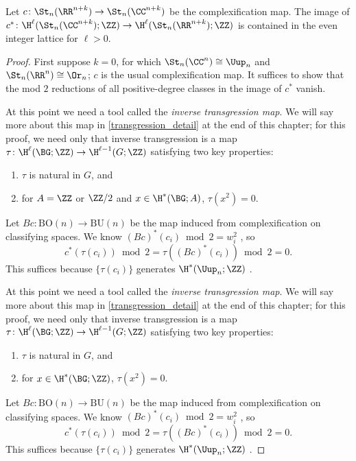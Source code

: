 \begin{lem}[{\cite[Lemma 5.12]{cs}}]
	\label{double_cpxif}
	Let $c\colon\St_n(\RR^{n+k})\to\St_n(\CC^{n+k})$ be the complexification map. The image of $c^*\colon
	\H^\ell(\St_n(\CC^{n+k});\ZZ)\to\H^\ell(\St_n(\RR^{n+k});\ZZ)$ is contained in the even integer lattice
	for $\ell > 0$.
\end{lem}
\begin{proof}
First suppose $k = 0$, for which $\St_n(\CC^n)\cong\Uup_n$ and $\St_n(\RR^n)\cong\Or_n$; $c$ is the usual
complexification map. It suffices to show that the mod $2$ reductions of all positive-degree classes in the image
of $c^*$ vanish.

At this point we need a tool called the \textit{inverse transgression map}. We will say more about this map in \cref{transgression_detail} at the end of this chapter; for
this proof, we need only that inverse transgression is a map $\tau\colon\H^\ell(\BG;\ZZ)\to\H^{\ell-1}(G;\ZZ)$
satisfying two key properties:
\begin{enumerate}[(1)]
	\item $\tau$ is natural in $G$, and
	\item for $A = \ZZ$ or $\ZZ/2$ and $x\in \H^*(\BG; A)$, $\tau(x^2) = 0$.
\end{enumerate}
Let $Bc\colon\mathrm{BO}(n)\to\mathrm{BU}(n)$ be the map induced from complexification on classifying spaces. We
know $(Bc)^*(c_i) \bmod 2 = w_i^2$ \cite[Theorem 1.5]{Bro82}, so
\begin{equation}
	c^*(\tau(c_i))\bmod 2 = \tau((Bc)^*(c_i))\bmod 2 = 0.
\end{equation}
This suffices because $\{\tau(c_i)\}$ generates $\H^*(\Uup_n;\ZZ)$ \cite[Théorèmes 8.2 et 8.3]{Bor54}.

	At this point we need a tool called the \textit{inverse transgression map}. We will say more about this map in \cref{transgression_detail} at the end of this chapter; for
	this proof, we need only that inverse transgression is a map $\tau\colon\H^\ell(\BG;\ZZ)\to\H^{\ell-1}(G;\ZZ)$
	satisfying two key properties:
	\begin{enumerate}[(1)]
		\item $\tau$ is natural in $G$, and
		\item for $x\in \H^*(\BG;\ZZ)$, $\tau(x^2) = 0$.
	\end{enumerate}
	Let $Bc\colon\mathrm{BO}(n)\to\mathrm{BU}(n)$ be the map induced from complexification on classifying spaces. We
	know $(Bc)^*(c_i) \bmod 2 = w_i^2$ \cite[Theorem 1.5]{Bro82}, so
	\begin{equation}
		c^*(\tau(c_i))\bmod 2 = \tau((Bc)^*(c_i))\bmod 2 = 0.
	\end{equation}
	This suffices because $\{\tau(c_i)\}$ generates $\H^*(\Uup_n;\ZZ)$ \cite[Théorèmes 8.2 et 8.3]{Bor54}.


\end{proof}
